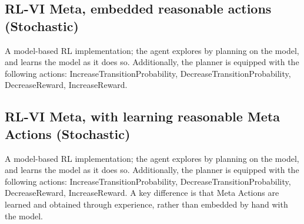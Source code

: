 \subsection{RL-VI Meta, embedded reasonable actions (Stochastic)}
A model-based RL implementation; the agent explores by planning on the model, and learns the model as it does so.
Additionally, the planner is equipped with the following actions: IncreaseTransitionProbability, DecreaseTransitionProbability, DecreaseReward, IncreaseReward.
\subsection{RL-VI Meta, with learning reasonable Meta Actions (Stochastic)}
A model-based RL implementation; the agent explores by planning on the model, and learns the model as it does so.
Additionally, the planner is equipped with the following actions: IncreaseTransitionProbability, DecreaseTransitionProbability, DecreaseReward, IncreaseReward. A key difference is that Meta Actions are learned and obtained through experience, rather than embedded by hand with the model.

